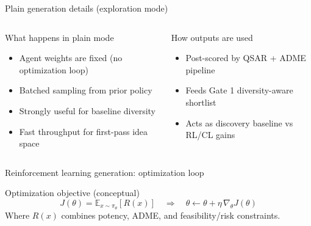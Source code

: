 \documentclass[aspectratio=169,10pt]{beamer}
\begin{document}
\begin{frame}{Plain generation details (exploration mode)}
  \begin{columns}[T]
      \begin{block}{What happens in plain mode}
        \begin{itemize}
          \item Agent weights are fixed (no optimization loop)
          \item Batched sampling from prior policy
          \item Strongly useful for baseline diversity
          \item Fast throughput for first-pass idea space
        \end{itemize}
      \end{block}
      \begin{block}{How outputs are used}
        \begin{itemize}
          \item Post-scored by QSAR + ADME pipeline
          \item Feeds Gate 1 diversity-aware shortlist
          \item Acts as discovery baseline vs RL/CL gains
        \end{itemize}
      \end{block}
  \end{columns}
\end{frame}

\begin{frame}{Reinforcement learning generation: optimization loop}
  \small
  \begin{center}
  \end{center}

  \vspace{3pt}
  \begin{block}{Optimization objective (conceptual)}
    \[
      J(\theta)=\mathbb{E}_{x\sim\pi_{\theta}}[R(x)]
      \quad \Rightarrow \quad
      \theta \leftarrow \theta + \eta\,\nabla_{\theta}J(\theta)
    \]
    Where \(R(x)\) combines potency, ADME, and feasibility/risk constraints.
  \end{block}
\end{frame}
\end{document}
